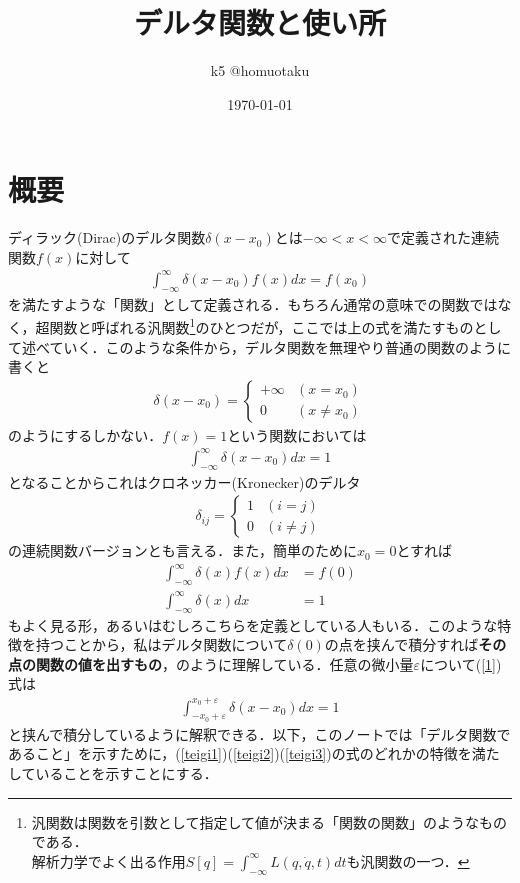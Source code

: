 \documentclass{jsarticle}
\title{デルタ関数と使い所}
\date{\today}
\author{k5 @homuotaku}
\begin{document}
\maketitle
\tableofcontents
\section{概要}
ディラック(Dirac)のデルタ関数$\delta(x-x_{0})$とは$-\infty<x<\infty$で定義された連続関数$f(x)$に対して
\begin{align}
\label{teigi1}\int_{-\infty}^{\infty}\delta(x-x_{0})f(x)dx=f(x_{0})
\end{align}
を満たすような「関数」として定義される．もちろん通常の意味での関数ではなく，超関数と呼ばれる汎関数\footnote{汎関数は関数を引数として指定して値が決まる「関数の関数」のようなものである．
\\解析力学でよく出る作用$ \displaystyle S[q]=\int_{-\infty}^{\infty}L(q,\dot{q},t)dt$も汎関数の一つ．}のひとつだが，ここでは上の式を満たすものとして述べていく．このような条件から，デルタ関数を無理やり普通の関数のように書くと
\begin{align}
\delta(x-x_{0})=\begin{cases}
+\infty&(x=x_{0})\\
0&(x\neq x_{0})
\end{cases}
\end{align}
のようにするしかない．$f(x)=1$という関数においては
\begin{align}
\label{1}\int_{-\infty}^{\infty}\delta(x-x_{0})dx=1
\end{align}
となることからこれはクロネッカー(Kronecker)のデルタ
\begin{align}
\delta_{ij}=\begin{cases}
1&(i=j)\\
0&(i\neq j)
\end{cases}
\end{align}
の連続関数バージョンとも言える．また，簡単のために$x_{0}=0$とすれば
\begin{align}
\label{teigi2}\int_{-\infty}^{\infty}\delta(x)f(x)dx&=f(0)\\
\label{teigi3}\int_{-\infty}^{\infty}\delta(x)dx&=1
\end{align}
もよく見る形，あるいはむしろこちらを定義としている人もいる．このような特徴を持つことから，私はデルタ関数について$\delta(0)$の点を挟んで積分すれば{\bf その点の関数の値を出すもの}，のように理解している．任意の微小量$\varepsilon$について(\ref{1})式は
\begin{align}
\int_{-x_{0}+\varepsilon}^{x_{0}+\varepsilon}\delta(x-x_{0})dx=1
\end{align}
と挟んで積分しているように解釈できる．以下，このノートでは「デルタ関数であること」を示すために，(\ref{teigi1})(\ref{teigi2})(\ref{teigi3})の式のどれかの特徴を満たしていることを示すことにする．
\end{document}
